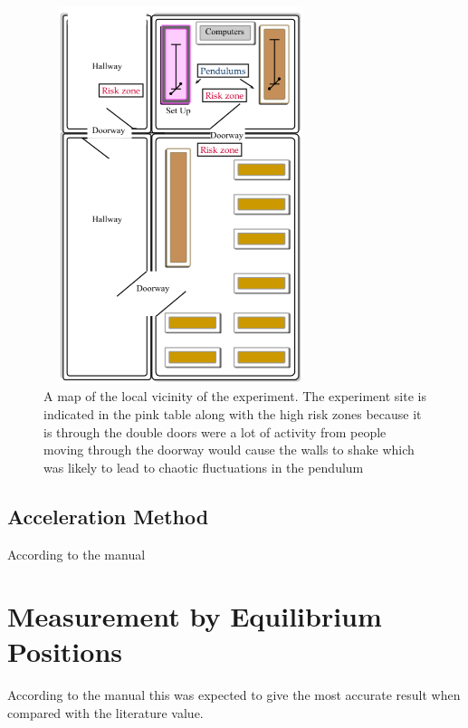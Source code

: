 \documentclass[12pt]{article}
\begin{document}
\begin{figure}[H]
\centering
\includegraphics[width=8cm, height=11cm]{images/map.png}
\caption{A map of the local vicinity of the experiment. The experiment site is indicated in the pink table along with the high risk zones because it is through the double doors were a lot of activity from people moving through the doorway would cause the walls to shake which was likely to lead to chaotic fluctuations in the pendulum}
\label{fig:probe}
\end{figure}

%
%

\subsection{Acceleration Method}

According to the manual

%
%


\section{Measurement by Equilibrium Positions}


According to the manual this was expected to give the most accurate result when compared with the literature value.

%
%
\end{document}
